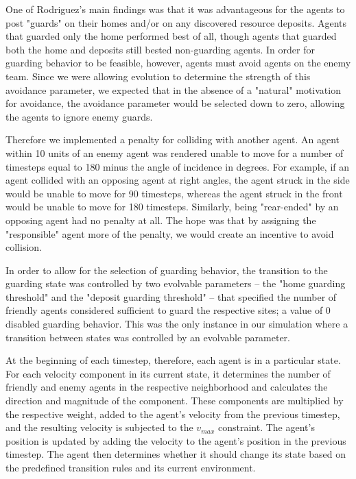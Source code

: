 \documentclass[12pt,journal,compsoc]{IEEEtran}
\begin{document}
One of Rodriguez's main findings was that it was advantageous for the agents to post "guards" on their homes and/or on any discovered resource deposits. Agents that guarded only the home performed best of all, though agents that guarded both the home and deposits still bested non-guarding agents. In order for guarding behavior to be feasible, however, agents must avoid agents on the enemy team. Since we were allowing evolution to determine the strength of this avoidance parameter, we expected that in the absence of a "natural" motivation for avoidance, the avoidance parameter would be selected down to zero, allowing the agents to ignore enemy guards.

Therefore we implemented a penalty for colliding with another agent. An agent within 10 units of an enemy agent was rendered unable to move for a number of timesteps equal to 180 minus the angle of incidence in degrees. For example, if an agent collided with an opposing agent at right angles, the agent struck in the side would be unable to move for 90 timesteps, whereas the agent struck in the front would be unable to move for 180 timesteps. Similarly, being "rear-ended" by an opposing agent had no penalty at all. The hope was that by assigning the "responsible" agent more of the penalty, we would create an incentive to avoid collision.

In order to allow for the selection of guarding behavior, the transition to the guarding state was controlled by two  evolvable parameters -- the "home guarding threshold" and the "deposit guarding threshold" -- that specified the number of friendly agents considered sufficient to guard the respective sites; a value of 0 disabled guarding behavior. This was the only instance in our simulation where a transition between states was controlled by an evolvable parameter.

At the beginning of each timestep, therefore, each agent is in a particular state. For each velocity component in its current state, it determines the number of friendly and enemy agents in the respective neighborhood and calculates the direction and magnitude of the component. These components are multiplied by the respective weight, added to the agent's velocity from the previous timestep, and the resulting velocity is subjected to the $v_{max}$ constraint. The agent's position is updated by adding the velocity to the agent's position in the previous timestep. The agent then determines whether it should change its state based on the predefined transition rules and its current environment.
\end{document}
